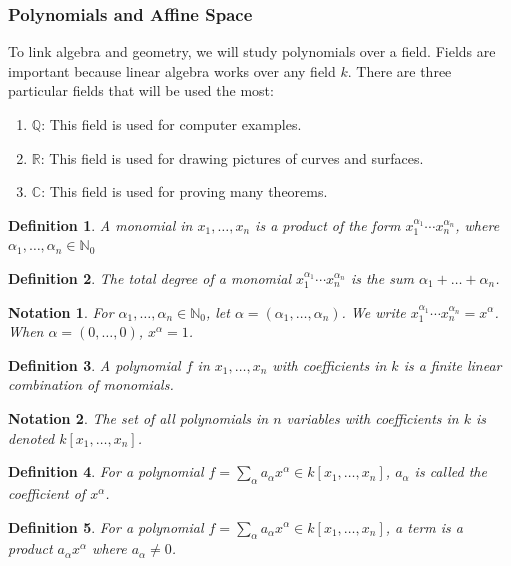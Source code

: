 \documentclass[oneside]{book}
\theoremstyle{mystyle}
\newtheorem{definition}{Definition}[section]
\newtheorem{notation}{Notation}[section]
\begin{document}
\subsubsection{Polynomials and Affine Space}
To link algebra and geometry, we will study polynomials over a field. Fields are important because linear algebra works over any field $k$. There are three particular fields that will be used the most:
\begin{enumerate}
    \item $\mathbb{Q}$: This field is used for computer examples.
    \item $\mathbb{R}$: This field is used for drawing pictures of curves and surfaces.
    \item $\mathbb{C}$: This field is used for proving many theorems.
\end{enumerate}
\begin{definition}
A monomial in $x_1,\hdots, x_n$ is a product of the form $x_1^{\alpha_1} \cdots x_n^{\alpha_n}$, where $\alpha_1,\hdots, \alpha_n \in \mathbb{N}_0$
\end{definition}
\begin{definition}
The total degree of a monomial $x_1^{\alpha_1}\cdots x_n^{\alpha_n}$ is the sum $\alpha_1+\hdots + \alpha_n$.
\end{definition}
\begin{notation}
For $\alpha_1,\hdots, \alpha_n\in \mathbb{N}_0$, let $\alpha = (\alpha_1,\hdots ,\alpha_n)$. We write $x_1^{\alpha_1} \cdots x_n^{\alpha_n}=x^\alpha$. When $\alpha = (0,\hdots, 0)$, $x^\alpha = 1$.
\end{notation}
\begin{definition}
A polynomial $f$ in $x_1,\hdots, x_n$ with coefficients in $k$ is a finite linear combination of monomials.
\end{definition}
\begin{notation}
The set of all polynomials in $n$ variables with coefficients in $k$ is denoted $k[x_1,\hdots ,x_n]$.
\end{notation}
\begin{definition}
For a polynomial $f = \sum_{\alpha} a_\alpha x^\alpha \in k[x_1,\hdots ,x_n]$, $a_\alpha$ is called the coefficient of $x^\alpha$.
\end{definition}
\begin{definition}
For a polynomial $f=\sum_{\alpha} a_\alpha x^\alpha \in k[x_1,\hdots ,x_n]$, a term is a product $a_\alpha x^\alpha$ where $a_\alpha \ne 0$.
\end{definition}
\end{document}
